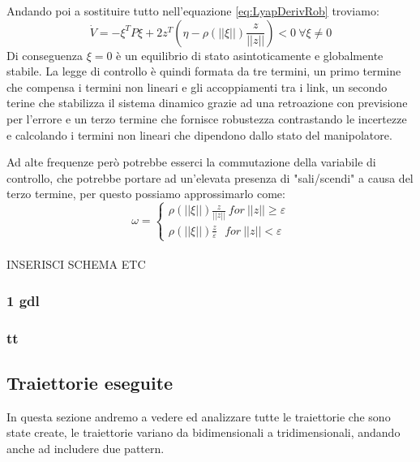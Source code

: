 Andando poi a sostituire tutto nell'equazione \ref{eq:LyapDerivRob} troviamo:
\begin{equation}
\dot{V} = -\xi^T P \xi + 2z^T(\eta-\rho(||\xi||) \frac{z}{||z||}) <0 \ \forall
\xi \neq 0
\end{equation}
Di conseguenza $\xi = 0$ è un equilibrio di stato asintoticamente e globalmente stabile. La legge di controllo è quindi formata da tre termini, un primo termine che compensa i termini non lineari e gli accoppiamenti tra i link, un secondo terine che stabilizza il sistema dinamico grazie ad una retroazione con previsione per l'errore e un terzo termine che fornisce robustezza contrastando le incertezze e calcolando i termini non lineari che dipendono dallo stato del manipolatore. 
\par Ad alte frequenze però potrebbe esserci la commutazione della variabile di controllo, che potrebbe portare ad un'elevata presenza di "sali/scendi" a causa del terzo termine, per questo possiamo approssimarlo come:
\begin{equation}
\omega = \begin{cases}
\rho(||\xi||) \frac{z}{||z||} \ for\ ||z||\ge \varepsilon \\
\rho(||\xi||) \frac{z}{\varepsilon} \ \ \ for \ ||z|| < \varepsilon
\end{cases}
\end{equation}
\\INSERISCI SCHEMA ETC
\subsubsection*{1 gdl}
\subsubsection*{tt}
\subsection{Traiettorie eseguite}
In questa sezione andremo a vedere ed analizzare tutte le traiettorie che sono state create, le traiettorie variano da bidimensionali a tridimensionali, andando anche ad includere due pattern.
